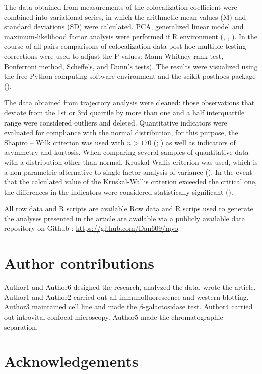 \documentclass[alpha-refs]{wiley-article}
\begin{document}
The data obtained from measurements of the colocalization coefficient were combined into variational series, in which the arithmetic mean values (M) and standard deviations (SD) were calculated.
PCA, generalized linear model and maximum-likelihood factor analysis were performed if R environment (\cite{husson2010exploratory}, \cite{dobson2008introduction}, \cite{lawley1971factor}).
In the course of all-pairs comparisons of colocalization data post hoc multiple testing corrections were used to adjust the P-values: Mann-Whitney rank test, Bonferroni method, Scheffe’s, and Dunn’s tests).
The results were visualized using the free Python computing software environment and the scikit-posthocs package (\cite{Terpilowski2019}).


The data obtained from trajectory analysis were cleaned: those observations that deviate from the 1st or 3rd quartile by more than one and a half interquartile range were considered outliers and deleted.
Quantitative indicators were evaluated for compliance with the normal distribution, for this purpose, the Shapiro – Wilk criterion  was used with $n > 170$ (\cite{shapiro1965analysis}; \cite{shapiro1972approximate}) as well as indicators of asymmetry and kurtosis.
When comparing several samples of quantitative data with a distribution other than normal, Kruskal-Wallis criterion was used, which is a non-parametric alternative to single-factor analysis of variance (\cite{kruskal1952use}).
In the event that the calculated value of the Kruskal-Wallis criterion exceeded the critical one, the differences in the indicators were considered statistically significant (\cite{wilcoxon1992individual}).

All row data and R scripts are available
Row data and R scrips used to generate the analyses presented in the article are available via a publicly available data repository on Github : \url{https://github.com/Dan609/myo}.


\section*{Author contributions}

Author1 and Author6 designed the research, analyzed the data, wrote the article.
Author1 and Author2 carried out all immunofluorescence and western blotting.
Author3 maintained cell line and made the $\beta$-galactosidase test.
Author4 carried out introvital confocal microscopy.
Author5 made the chromatographic separation.

\section*{Acknowledgements}
\end{document}

